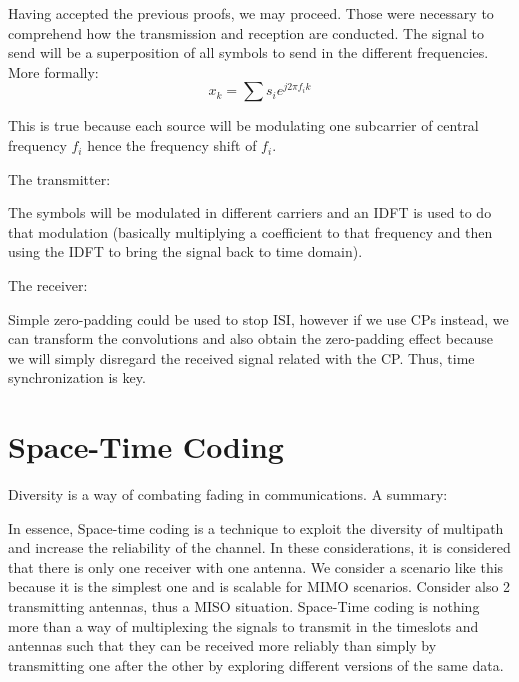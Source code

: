 \documentclass[12pt, a4paper]{article}
\begin{document}
\Vhrulefill





Having accepted the previous proofs, we may proceed. Those were necessary to comprehend how the transmission and reception are conducted. The signal to send will be a superposition of all symbols to send in the different frequencies. More formally:
\begin{equation}
    x_k = \sum s_i e^{j 2 \pi f_i k}
\end{equation}

This is true because each source will be modulating one subcarrier of central frequency $f_i$ hence the frequency shift of $f_i$.


The transmitter:

The symbols will be modulated in different carriers and an IDFT is used to do that modulation (basically multiplying a coefficient to that frequency and then using the IDFT to bring the signal back to time domain). 

The receiver:


Simple zero-padding could be used to stop ISI, however if we use CPs instead, we can transform the convolutions and also obtain the zero-padding effect because we will simply disregard the received signal related with the CP. Thus, time synchronization is key.


\section{Space-Time Coding}

\par Diversity is a way of combating fading in communications. A summary:



\par In essence, Space-time coding is a technique to exploit the diversity of multipath and increase the reliability of the channel. In these considerations, it is considered that there is only one receiver with one antenna. We consider a scenario like this because it is the simplest one and is scalable for MIMO scenarios. Consider also 2 transmitting antennas, thus a MISO situation. Space-Time coding is nothing more than a way of multiplexing the signals to transmit in the timeslots and antennas such that they can be received more reliably than simply by transmitting one after the other by exploring different versions of the same data.
\end{document}
